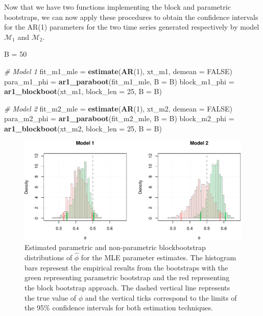 \documentclass[]{book}
\newenvironment{Shaded}{\begin{snugshade}}{\end{snugshade}}
\newcommand{\CommentTok}[1]{\textcolor[rgb]{0.56,0.35,0.01}{\textit{#1}}}
\newcommand{\DataTypeTok}[1]{\textcolor[rgb]{0.13,0.29,0.53}{#1}}
\newcommand{\DecValTok}[1]{\textcolor[rgb]{0.00,0.00,0.81}{#1}}
\newcommand{\KeywordTok}[1]{\textcolor[rgb]{0.13,0.29,0.53}{\textbf{#1}}}
\newcommand{\NormalTok}[1]{#1}
\newcommand{\OtherTok}[1]{\textcolor[rgb]{0.56,0.35,0.01}{#1}}
\newcommand{\StringTok}[1]{\textcolor[rgb]{0.31,0.60,0.02}{#1}}
\theoremstyle{definition}
\theoremstyle{definition}
\theoremstyle{definition}
\theoremstyle{remark}
\begin{document}
Now that we have two functions implementing the block and parametric
bootstraps, we can now apply these procedures to obtain the confidence
intervals for the AR(1) parameters for the two time series generated
respectively by model \(\mathcal{M}_1\) and \(\mathcal{M}_2\).

\begin{Shaded}
\begin{Highlighting}[]
\NormalTok{B =}\StringTok{ }\DecValTok{50}

\CommentTok{# Model 1}
\NormalTok{fit_m1_mle =}\StringTok{ }\KeywordTok{estimate}\NormalTok{(}\KeywordTok{AR}\NormalTok{(}\DecValTok{1}\NormalTok{), xt_m1, }\DataTypeTok{demean =} \OtherTok{FALSE}\NormalTok{)}
\NormalTok{para_m1_phi  =}\StringTok{ }\KeywordTok{ar1_paraboot}\NormalTok{(fit_m1_mle, }\DataTypeTok{B =}\NormalTok{ B)}
\NormalTok{block_m1_phi =}\StringTok{ }\KeywordTok{ar1_blockboot}\NormalTok{(xt_m1, }\DataTypeTok{block_len =} \DecValTok{25}\NormalTok{, }\DataTypeTok{B =}\NormalTok{ B)}

\CommentTok{# Model 2}
\NormalTok{fit_m2_mle =}\StringTok{ }\KeywordTok{estimate}\NormalTok{(}\KeywordTok{AR}\NormalTok{(}\DecValTok{1}\NormalTok{), xt_m2, }\DataTypeTok{demean =} \OtherTok{FALSE}\NormalTok{)}
\NormalTok{para_m2_phi  =}\StringTok{ }\KeywordTok{ar1_paraboot}\NormalTok{(fit_m2_mle, }\DataTypeTok{B =}\NormalTok{ B)}
\NormalTok{block_m2_phi =}\StringTok{ }\KeywordTok{ar1_blockboot}\NormalTok{(xt_m2, }\DataTypeTok{block_len =} \DecValTok{25}\NormalTok{, }\DataTypeTok{B =}\NormalTok{ B)}
\end{Highlighting}
\end{Shaded}

\begin{figure}
\centering
\includegraphics{ts_files/figure-latex/blockbootmodels-1.pdf}
\caption{\label{fig:blockbootmodels}Estimated parametric and non-parametric
blockbootstrap distributions of \(\hat{\phi}\) for the MLE parameter
estimates. The histogram bars represent the empirical results from the
bootstraps with the green representing parametric bootstrap and the red
representing the block bootstrap approach. The dashed vertical line
represents the true value of \(\phi\) and the vertical ticks correspond
to the limits of the 95\% confidence intervals for both estimation
techniques.}
\end{figure}
\end{document}
